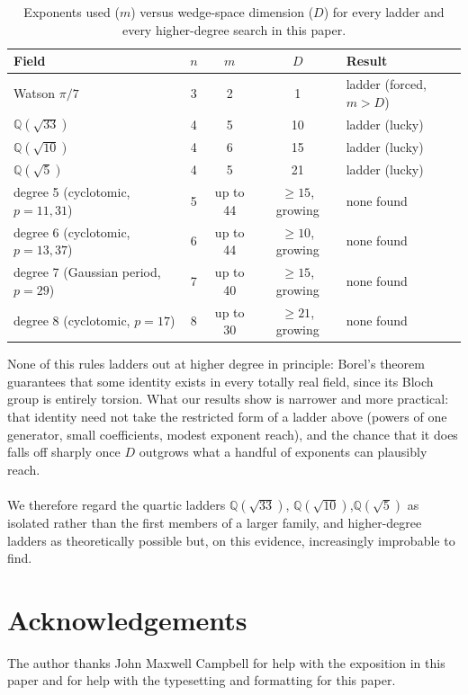 \documentclass[12pt]{article}
\begin{document}
{\begin{table}[H]
\centering
\begin{tabular}{l|c|c|c|l}
Field & $n$ & $m$ & $D$ & Result \\ \hline
Watson $\pi/7$          & 3 & 2 & 1  & ladder (forced, $m>D$) \\
$\mathbb{Q}(\sqrt{33})$ & 4 & 5 & 10 & ladder (lucky) \\
$\mathbb{Q}(\sqrt{10})$ & 4 & 6 & 15 & ladder (lucky) \\
$\mathbb{Q}(\sqrt5)$    & 4 & 5 & 21 & ladder (lucky) \\
degree 5 (cyclotomic, $p=11,31$) & 5 & up to 44 & $\ge15$, growing & none found \\
degree 6 (cyclotomic, $p=13,37$) & 6 & up to 44 & $\ge10$, growing & none found \\
degree 7 (Gaussian period, $p=29$) & 7 & up to 40 & $\ge15$, growing & none found \\
degree 8 (cyclotomic, $p=17$)      & 8 & up to 30 & $\ge21$, growing & none found
\end{tabular}
\caption{Exponents used ($m$) versus wedge-space dimension ($D$) for every ladder and every higher-degree search in this paper.}
\label{tab:summary}
\end{table}

\noindent None of this rules ladders out at higher degree in principle: Borel's theorem guarantees that some identity exists in every totally real field, since its Bloch group is entirely torsion. What our results show is narrower and more practical: that identity need not take the restricted form of a ladder above (powers of one generator, small coefficients, modest exponent reach), and the chance that it does falls off sharply once $D$ outgrows what a handful of exponents can plausibly reach.
\\
\\
\noindent We therefore regard the quartic ladders $\mathbb{Q}(\sqrt{33})$, $\mathbb{Q}(\sqrt{10})$,$\mathbb{Q}(\sqrt{5})$ as isolated rather than the first members of a
larger family, and higher-degree ladders as theoretically possible
but, on this evidence, increasingly improbable to find.

\section{Acknowledgements}
 The author thanks John Maxwell Campbell for help with the exposition in this paper and for help with the typesetting and formatting 
 for this paper. 

}
\end{document}
